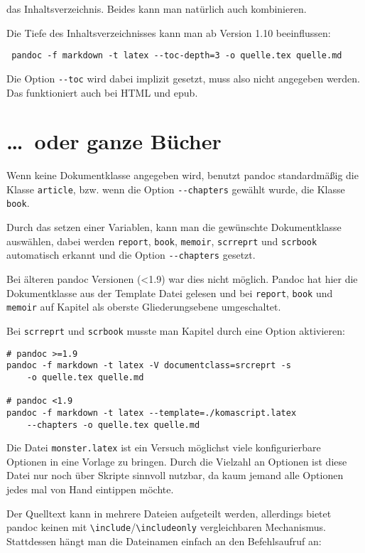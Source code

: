 \documentclass[11pt,ngerman,a4paper]{article}
\begin{document}
das Inhaltsverzeichnis. Beides kann man natürlich auch kombinieren.

Die Tiefe des Inhaltsverzeichnisses kann man ab Version 1.10
beeinflussen:

\begin{verbatim}
 pandoc -f markdown -t latex --toc-depth=3 -o quelle.tex quelle.md
\end{verbatim}

Die Option \texttt{-{}-toc} wird dabei implizit gesetzt, muss also nicht
angegeben werden. Das funktioniert auch bei HTML und epub.

\section{\ldots{}~oder ganze Bücher}

Wenn keine Dokumentklasse angegeben wird, benutzt pandoc standardmäßig
die Klasse \texttt{article}, bzw. wenn die Option \texttt{-{}-chapters}
gewählt wurde, die Klasse \texttt{book}.

Durch das setzen einer Variablen, kann man die gewünschte Dokumentklasse
auswählen, dabei werden \texttt{report}, \texttt{book}, \texttt{memoir},
\texttt{scrreprt} und \texttt{scrbook} automatisch erkannt und die
Option \texttt{-{}-chapters} gesetzt.

Bei älteren pandoc Versionen (\textless{}1.9) war dies nicht möglich.
Pandoc hat hier die Dokumentklasse aus der Template Datei gelesen und
bei \texttt{report}, \texttt{book} und \texttt{memoir} auf Kapitel als
oberste Gliederungsebene umgeschaltet.

Bei \texttt{scrreprt} und \texttt{scrbook} musste man Kapitel durch eine
Option aktivieren:

\begin{verbatim}
# pandoc >=1.9
pandoc -f markdown -t latex -V documentclass=srcreprt -s
    -o quelle.tex quelle.md

# pandoc <1.9
pandoc -f markdown -t latex --template=./komascript.latex 
    --chapters -o quelle.tex quelle.md
\end{verbatim}

Die Datei \texttt{monster.latex} ist ein Versuch möglichst viele
konfigurierbare Optionen in eine Vorlage zu bringen. Durch die Vielzahl
an Optionen ist diese Datei nur noch über Skripte sinnvoll nutzbar, da
kaum jemand alle Optionen jedes mal von Hand eintippen möchte.

Der Quelltext kann in mehrere Dateien aufgeteilt werden, allerdings
bietet pandoc keinen mit
\texttt{\textbackslash{}include}/\texttt{\textbackslash{}includeonly}
vergleichbaren Mechanismus. Stattdessen hängt man die Dateinamen einfach
an den Befehlsaufruf an:
\end{document}
